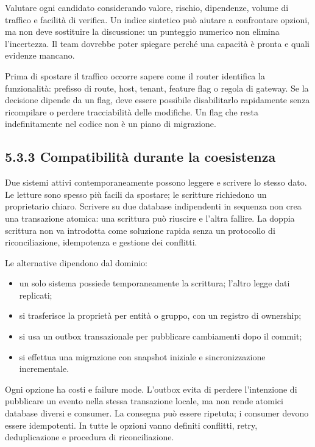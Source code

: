 \documentclass[
  italian,
  10pt,
]{book}
\providecommand{\tightlist}{%
  \setlength{\itemsep}{0pt}\setlength{\parskip}{0pt}}
\begin{document}
Valutare ogni candidato considerando valore, rischio, dipendenze, volume
di traffico e facilità di verifica. Un indice sintetico può aiutare a
confrontare opzioni, ma non deve sostituire la discussione: un punteggio
numerico non elimina l'incertezza. Il team dovrebbe poter spiegare
perché una capacità è pronta e quali evidenze mancano.

Prima di spostare il traffico occorre sapere come il router identifica
la funzionalità: prefisso di route, host, tenant, feature flag o regola
di gateway. Se la decisione dipende da un flag, deve essere possibile
disabilitarlo rapidamente senza ricompilare o perdere tracciabilità
delle modifiche. Un flag che resta indefinitamente nel codice non è un
piano di migrazione.

\subsection{5.3.3 Compatibilità durante la
coesistenza}\label{compatibilituxe0-durante-la-coesistenza}

Due sistemi attivi contemporaneamente possono leggere e scrivere lo
stesso dato. Le letture sono spesso più facili da spostare; le scritture
richiedono un proprietario chiaro. Scrivere su due database indipendenti
in sequenza non crea una transazione atomica: una scrittura può riuscire
e l'altra fallire. La doppia scrittura non va introdotta come soluzione
rapida senza un protocollo di riconciliazione, idempotenza e gestione
dei conflitti.

Le alternative dipendono dal dominio:

\begin{itemize}
\tightlist
\item
  un solo sistema possiede temporaneamente la scrittura; l'altro legge
  dati replicati;
\item
  si trasferisce la proprietà per entità o gruppo, con un registro di
  ownership;
\item
  si usa un outbox transazionale per pubblicare cambiamenti dopo il
  commit;
\item
  si effettua una migrazione con snapshot iniziale e sincronizzazione
  incrementale.
\end{itemize}

Ogni opzione ha costi e failure mode. L'outbox evita di perdere
l'intenzione di pubblicare un evento nella stessa transazione locale, ma
non rende atomici database diversi e consumer. La consegna può essere
ripetuta; i consumer devono essere idempotenti. In tutte le opzioni
vanno definiti conflitti, retry, deduplicazione e procedura di
riconciliazione.
\end{document}
